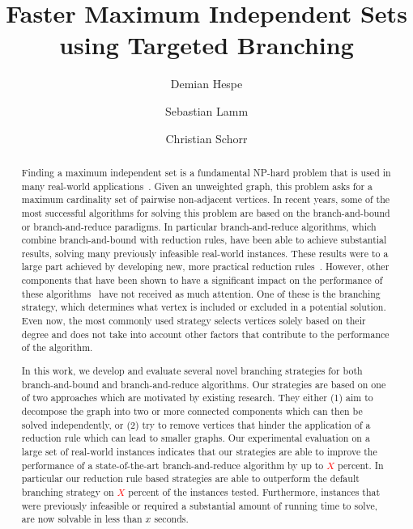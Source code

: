 \documentclass[a4paper,UKenglish,cleveref, autoref, thm-restate]{lipics-v2021}
\title{Faster Maximum Independent Sets using Targeted Branching} %
\author{Demian Hespe}{Karlsruhe Institute of Technology, Institute for
  Theoretical Informatics, Germany}{hespe@kit.edu}{https://orcid.org/0000-0001-6232-2951}{}
\author{Sebastian Lamm}{Karlsruhe Institute of Technology, Institute for
  Theoretical Informatics, Germany}{lamm@kit.edu}{}{\todo{Add funding}}
\author{Christian Schorr}{Karlsruhe Institute of Technology, Institute for
  Theoretical Informatics, Germany}{christian.schorr@student.kit.edu}{}{}
\begin{document}
\maketitle

\begin{abstract}
  Finding a maximum independent set is a fundamental NP-hard problem that is used in many real-world applications~\cite{BIO1,BIO2,RP,NW,CG}.
Given an unweighted graph, this problem asks for a maximum cardinality set of pairwise non-adjacent vertices.
In recent years, some of the most successful algorithms for solving this problem are based on the branch-and-bound or branch-and-reduce paradigms.
In particular branch-and-reduce algorithms, which combine branch-and-bound with reduction rules, have been able to achieve substantial results, solving many previously infeasible real-world instances.
These results were to a large part achieved by developing new, more practical reduction rules~\cite{alsahafy2020computing,ChangKern,dahlum2016accelerating,hespe2019scalable}.
However, other components that have been shown to have a significant impact on the performance of these algorithms~\cite{AkibaIwata} have not received as much attention.
One of these is the branching strategy, which determines what vertex is included or excluded in a potential solution.
Even now, the most commonly used strategy selects vertices solely based on their degree and does not take into account other factors that contribute to the performance of the algorithm.

In this work, we develop and evaluate several novel branching strategies for both branch-and-bound and branch-and-reduce algorithms.
Our strategies are based on one of two approaches which are motivated by existing research. 
They either (1) aim to decompose the graph into two or more connected components which can then be solved independently, or (2) try to remove vertices that hinder the application of a reduction rule which can lead to smaller graphs.
Our experimental evaluation on a large set of real-world instances indicates
that our strategies are able to improve the performance of a state-of-the-art
branch-and-reduce algorithm by up to \textcolor{red}{$X$} percent.
In particular our reduction rule based strategies are able to outperform the default branching strategy on \textcolor{red}{$X$} percent of the instances tested.
Furthermore, instances that were previously infeasible or required a substantial
amount of running time to solve, are now solvable in less than $x$
seconds.

\end{abstract}
\end{document}
